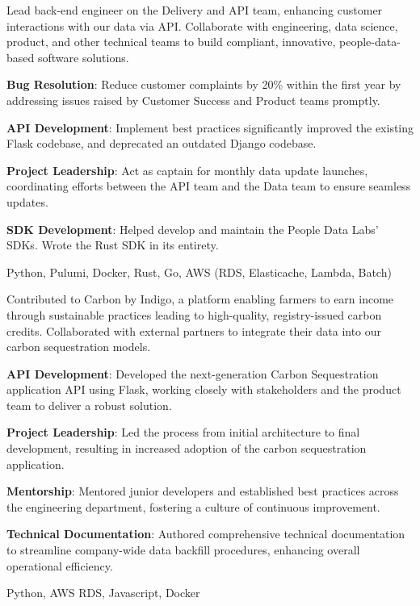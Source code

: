 \documentclass{bluefin_cv}
\begin{document}
{
  Lead back-end engineer on the Delivery and API team, enhancing customer interactions with our data via API.
  Collaborate with engineering, data science, product, and other technical teams to build compliant, innovative, people-data-based software solutions.
}
{
  \item {\bf Bug Resolution}: Reduce customer complaints by 20\% within the first year by addressing issues raised by Customer Success and Product teams promptly.
  \item {\bf API Development}: Implement best practices significantly improved the existing Flask codebase, and deprecated an outdated Django codebase.
  \item {\bf Project Leadership}: Act as captain for monthly data update launches, coordinating efforts between the API team and the Data team to ensure seamless updates.
  \item {\bf SDK Development}: Helped develop and maintain the People Data Labs' SDKs. Wrote the Rust SDK in its entirety.
}
{
  Python,
  Pulumi,
  Docker,
  Rust,
  Go,
  AWS (RDS, Elasticache, Lambda, Batch)
}

{
  Contributed to Carbon by Indigo, a platform enabling farmers to earn income through sustainable practices leading to high-quality, registry-issued carbon credits.
  Collaborated with external partners to integrate their data into our carbon sequestration models.
}
{
  \item {\bf API Development}: Developed the next-generation Carbon Sequestration application API using Flask, working closely with stakeholders and the product team to deliver a robust solution.
  \item {\bf Project Leadership}: Led the process from initial architecture to final development, resulting in increased adoption of the carbon sequestration application.
  \item {\bf Mentorship}: Mentored junior developers and established best practices across the engineering department, fostering a culture of continuous improvement.
  \item {\bf Technical Documentation}: Authored comprehensive technical documentation to streamline company-wide data backfill procedures, enhancing overall operational efficiency.
}
{
  Python,
  AWS RDS,
  Javascript,
  Docker
}
\end{document}
